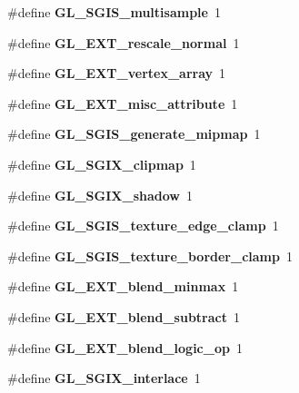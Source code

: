 \begin{DoxyCompactItemize}
\item 
\#define {\bfseries G\+L\+\_\+\+S\+G\+I\+S\+\_\+multisample}~1\label{_s_d_l__opengl_8h_add53d59948c91cfb914450c9b8019491}

\item 
\#define {\bfseries G\+L\+\_\+\+E\+X\+T\+\_\+rescale\+\_\+normal}~1\label{_s_d_l__opengl_8h_adce03eecce70994872ed60eb1ab3cff8}

\item 
\#define {\bfseries G\+L\+\_\+\+E\+X\+T\+\_\+vertex\+\_\+array}~1\label{_s_d_l__opengl_8h_ac525507a0e70bcdbeea036484a0eea62}

\item 
\#define {\bfseries G\+L\+\_\+\+E\+X\+T\+\_\+misc\+\_\+attribute}~1\label{_s_d_l__opengl_8h_a5a3606df50a00c69af87fe196498af42}

\item 
\#define {\bfseries G\+L\+\_\+\+S\+G\+I\+S\+\_\+generate\+\_\+mipmap}~1\label{_s_d_l__opengl_8h_a608de9897caa4c408b6f1083abe1c2ba}

\item 
\#define {\bfseries G\+L\+\_\+\+S\+G\+I\+X\+\_\+clipmap}~1\label{_s_d_l__opengl_8h_a44ac70e5591a89f52d738cec23897229}

\item 
\#define {\bfseries G\+L\+\_\+\+S\+G\+I\+X\+\_\+shadow}~1\label{_s_d_l__opengl_8h_a555b635cf8eeafa4334ae29f09da6b84}

\item 
\#define {\bfseries G\+L\+\_\+\+S\+G\+I\+S\+\_\+texture\+\_\+edge\+\_\+clamp}~1\label{_s_d_l__opengl_8h_ac85770ab31ac7dd3e2ebbe148d95e4ed}

\item 
\#define {\bfseries G\+L\+\_\+\+S\+G\+I\+S\+\_\+texture\+\_\+border\+\_\+clamp}~1\label{_s_d_l__opengl_8h_a997be60e68a4b84179b5db2c88d308d8}

\item 
\#define {\bfseries G\+L\+\_\+\+E\+X\+T\+\_\+blend\+\_\+minmax}~1\label{_s_d_l__opengl_8h_aca9a340fdf5ab9a27d6fb47a0909ce04}

\item 
\#define {\bfseries G\+L\+\_\+\+E\+X\+T\+\_\+blend\+\_\+subtract}~1\label{_s_d_l__opengl_8h_a0490f7eeafebf2764e2f619714d01fec}

\item 
\#define {\bfseries G\+L\+\_\+\+E\+X\+T\+\_\+blend\+\_\+logic\+\_\+op}~1\label{_s_d_l__opengl_8h_aa1aa3faa1e82e39106a172b131f15575}

\item 
\#define {\bfseries G\+L\+\_\+\+S\+G\+I\+X\+\_\+interlace}~1\label{_s_d_l__opengl_8h_a63e0af1acbd328bc8d66489d92da1991}


\end{DoxyCompactItemize}
